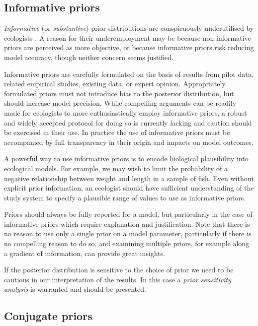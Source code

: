 \documentclass[
]{book}
\begin{document}
\hypertarget{inform-priors}{%
\subsection{Informative priors}\label{inform-priors}}

\emph{Informative} (or \emph{substantive}) prior distributions are conspicuously underutilised by ecologists \citep{Banner_2020}. A reason for their underemployment may be because non-informative priors are perceived as more objective, or because informative priors risk reducing model accuracy, though neither concern seems justified.

Informative priors are carefully formulated on the basis of results from pilot data, related empirical studies, existing data, or expert opinion. Appropriately formulated priors must not introduce bias to the posterior distribution, but should increase model precision. While compelling arguments can be readily made for ecologists to more enthusiastically employ informative priors, a robust and widely accepted protocol for doing so is currently lacking and caution should be exercised in their use. In practice the use of informative priors must be accompanied by full transparency in their origin and impacts on model outcomes.

A powerful way to use informative priors is to encode biological plausibility into ecological models. For example, we may wish to limit the probability of a negative relationship between weight and length in a sample of fish. Even without explicit prior information, an ecologist should have sufficient understanding of the study system to specify a plausible range of values to use as informative priors.

Priors should always be fully reported for a model, but particularly in the case of informative priors which require explanation and justification. Note that there is no reason to use only a single prior on a model parameter, particularly if there is no compelling reason to do so, and examining multiple priors, for example along a gradient of information, can provide great insights.

If the posterior distribution is sensitive to the choice of prior we need to be cautious in our interpretation of the results. In this case a \emph{prior sensitivity analysis} is warranted and should be presented.

\hypertarget{conj-priors}{%
\subsection{Conjugate priors}\label{conj-priors}}
\end{document}
